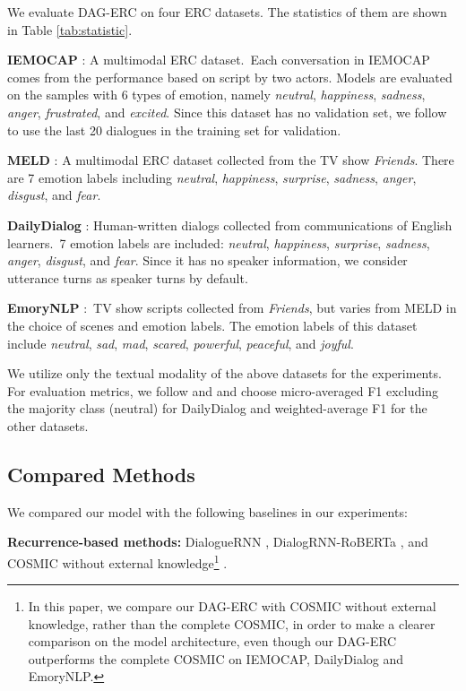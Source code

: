 \documentclass[11pt,a4paper]{article}
\begin{document}
We evaluate DAG-ERC on four ERC datasets. The statistics of them are shown in Table \ref{tab:statistic}.

\noindent\textbf{IEMOCAP} \citep{busso2008iemocap}: A multimodal ERC dataset.~Each conversation in IEMOCAP comes from the performance based on script by two actors. Models are evaluated on the samples with 6 types of emotion, namely \textit{neutral}, \textit{happiness}, \textit{sadness}, \textit{anger}, \textit{frustrated}, and \textit{excited}. Since this dataset has no validation set, we follow \citet{shen2020dialogxl} to use the last 20 dialogues in the training set for validation.

\noindent\textbf{MELD} \citep{poria2019meld}: A multimodal ERC dataset collected from the TV show \textit{Friends}. There are 7 emotion labels including \textit{neutral}, \textit{happiness}, \textit{surprise}, \textit{sadness}, \textit{anger}, \textit{disgust}, and \textit{fear}. 

\noindent\textbf{DailyDialog} \citep{li2017dailydialog}: Human-written dialogs collected from communications of English learners.~7 emotion labels are included: \textit{neutral},   \textit{happiness}, \textit{surprise}, \textit{sadness}, \textit{anger}, \textit{disgust}, and \textit{fear}. Since it has no speaker information, we consider utterance turns as speaker turns by default.

\noindent\textbf{EmoryNLP} \citep{zahiri2017emotion}:~TV show scripts collected from \textit{Friends}, but varies from MELD in the choice of scenes and emotion labels. The emotion labels of this dataset include \textit{neutral}, \textit{sad}, \textit{mad}, \textit{scared}, \textit{powerful}, \textit{peaceful}, and \textit{joyful}.

We utilize only the textual modality of the above datasets for the experiments. For evaluation metrics, we follow \citet{ishiwatari2020relation} and \citet{shen2020dialogxl} and choose micro-averaged F1 excluding the majority class (neutral) for DailyDialog and weighted-average F1 for the other datasets.

\subsection{Compared Methods}
We compared our model with the following baselines in our experiments:

\noindent \textbf{Recurrence-based methods:} DialogueRNN \citep{majumder2019dialoguernn}, DialogRNN-RoBERTa \citep{ghosal2020cosmic}, and COSMIC without external knowledge\footnote{In this paper, we compare our DAG-ERC with COSMIC without external knowledge, rather than the complete COSMIC, in order to make a clearer comparison on the model architecture, even though our DAG-ERC outperforms the complete COSMIC on IEMOCAP, DailyDialog and EmoryNLP.} \citep{ghosal2020cosmic}.
\end{document}
